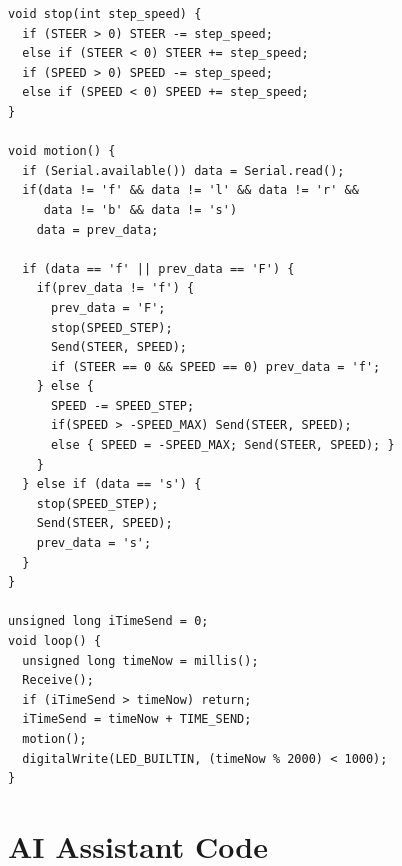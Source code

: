 \documentclass[12pt,a4paper]{report}
\begin{document}
\begin{lstlisting}[caption={Arduino motor control firmware}, label=lst:arduino-code]
void stop(int step_speed) {
  if (STEER > 0) STEER -= step_speed;
  else if (STEER < 0) STEER += step_speed;
  if (SPEED > 0) SPEED -= step_speed;
  else if (SPEED < 0) SPEED += step_speed;
}

void motion() {
  if (Serial.available()) data = Serial.read();
  if(data != 'f' && data != 'l' && data != 'r' &&
     data != 'b' && data != 's')
    data = prev_data;

  if (data == 'f' || prev_data == 'F') {
    if(prev_data != 'f') {
      prev_data = 'F';
      stop(SPEED_STEP);
      Send(STEER, SPEED);
      if (STEER == 0 && SPEED == 0) prev_data = 'f';
    } else {
      SPEED -= SPEED_STEP;
      if(SPEED > -SPEED_MAX) Send(STEER, SPEED);
      else { SPEED = -SPEED_MAX; Send(STEER, SPEED); }
    }
  } else if (data == 's') {
    stop(SPEED_STEP);
    Send(STEER, SPEED);
    prev_data = 's';
  }
}

unsigned long iTimeSend = 0;
void loop() {
  unsigned long timeNow = millis();
  Receive();
  if (iTimeSend > timeNow) return;
  iTimeSend = timeNow + TIME_SEND;
  motion();
  digitalWrite(LED_BUILTIN, (timeNow % 2000) < 1000);
}
\end{lstlisting}

\section{AI Assistant Code}
\label{sec:ai-code}
\end{document}
